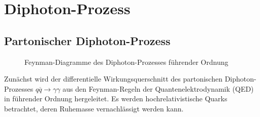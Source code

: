 \chapter{Diphoton-Prozess}
\label{2}
\section{Partonischer Diphoton-Prozess}
\begin{figure}
	\caption{Feynman-Diagramme des Diphoton-Prozesses führender Ordnung}
	\label{feynman-diagramme}
\end{figure}
Zunächst wird der differentielle Wirkungsquerschnitt des partonischen Diphoton-Prozesses $q\overline{q} \rightarrow \gamma \gamma$ aus den Feynman-Regeln der Quantenelektrodynamik (QED) in führender Ordnung hergeleitet. Es werden hochrelativistische Quarks betrachtet, deren Ruhemasse vernachlässigt werden kann.

